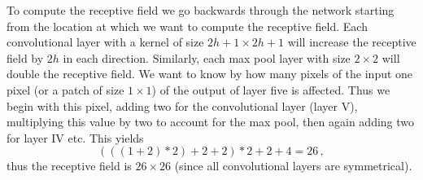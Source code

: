 To compute the receptive field we go backwards through the network starting from
the location at which we want to compute the receptive field. Each convolutional
layer with a kernel of size $2h+1 \times 2h+1$ will increase the receptive field
by $2h$ in each direction.  Similarly, each max pool layer with size
$2 \times 2$ will double the receptive field. We want to know by how many pixels
of the input one pixel (or a patch of size $1 \times 1$) of the output of layer
five is affected. Thus we begin with this pixel, adding two for the
convolutional layer (layer V), multiplying this value by two to account for the
max pool, then again adding two for layer IV etc. This yields
\begin{equation*}
  (((1 + 2) * 2) + 2 + 2)*2 + 2 + 4 = 26\,,
\end{equation*}
thus the receptive field is $26 \times 26$ (since all convolutional layers are
symmetrical).

